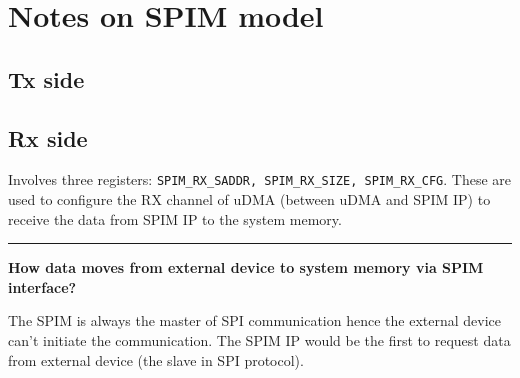 \documentclass{article}
\begin{document}
\section{Notes on SPIM model}
\subsection{Tx side}

\subsection{Rx side}
Involves three registers: \texttt{SPIM\_RX\_SADDR, SPIM\_RX\_SIZE, SPIM\_RX\_CFG}. These are used to configure the RX
channel of uDMA (between uDMA and SPIM IP) to receive the data from SPIM IP to the system memory.

\noindent \rule[0.5ex]{\linewidth}{1pt}

\noindent \textbf{How data moves from external device to system memory via SPIM interface?}

The SPIM is always the master of SPI communication hence the external device can't initiate the communication. The
SPIM IP would be the first to request data from external device (the slave in SPI protocol).
\end{document}
